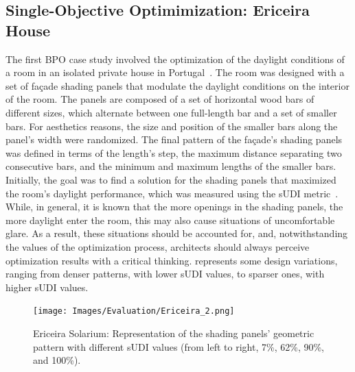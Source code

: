\subsection{Single-Objective Optimimization: Ericeira House}
\label{ssec:soocasestudy}
The first \ac{BPO} case study involved the optimization of the daylight conditions of a room in an isolated private house in Portugal~\cite{Caetano2018,Belem2018optimizeddesign}. The room was designed with a set of façade shading panels that modulate the daylight conditions on the interior of the room. The panels are composed of a set of horizontal wood bars of different sizes, which alternate between one full-length bar and a set of smaller bars. For aesthetics reasons, the size and position of the smaller bars along the panel's width were randomized. The final pattern of the façade's shading panels was defined in terms of the length’s step, the maximum distance separating two consecutive bars, and the minimum and maximum lengths of the smaller bars. Initially, the goal was to find a solution for the shading panels that maximized the room's daylight performance, which was measured using the \ac{sUDI} metric~\cite{Nabil2006}. While, in general, it is known that the more openings in the shading panels, the more daylight enter the room, this may also cause situations of uncomfortable glare. As a result, these situations should be accounted for, and, notwithstanding the values of the optimization process, architects should always perceive optimization results with a critical thinking.  represents some design variations, ranging from denser patterns, with lower \ac{sUDI} values, to sparser ones, with higher \ac{sUDI} values.


\begin{figure}[htpb]
	\centering
	\texttt{[image: Images/Evaluation/Ericeira\_2.png]}
	\caption{Ericeira Solarium: Representation of the shading panels’ geometric pattern with different sUDI values (from left to right, 7\%, 62\%, 90\%, and 100\%).}
	\label{fig:ericeira_multiple_panels}
\end{figure}

